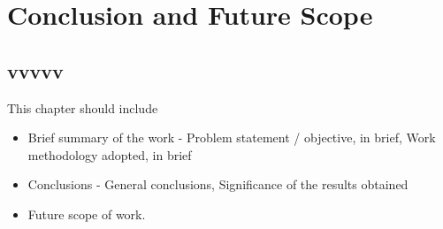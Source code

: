 \chapter{Conclusion and Future Scope}

\section{vvvvv}

This chapter should include 
\begin{itemize}
\item Brief summary of the work -  Problem statement / objective, in brief, Work methodology adopted, in brief
\item Conclusions - 	General conclusions, Significance of the results obtained
\item Future scope of work.
\end{itemize}

